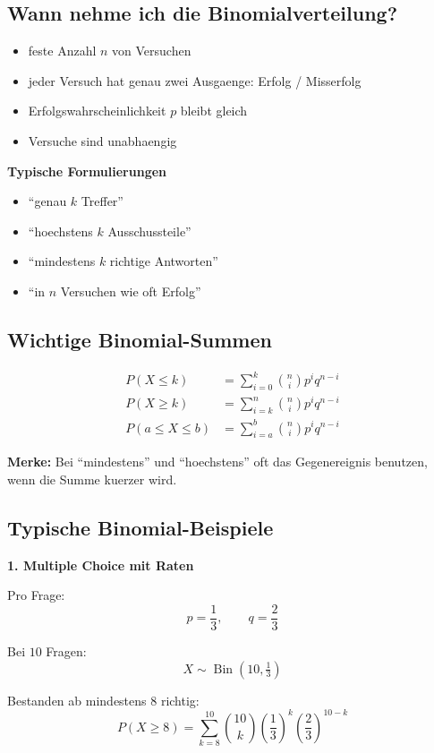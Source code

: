 \documentclass[a4paper,11pt]{article}
\begin{document}
\subsection{Wann nehme ich die Binomialverteilung?}
\begin{itemize}
  \item feste Anzahl $n$ von Versuchen
  \item jeder Versuch hat genau zwei Ausgaenge: Erfolg / Misserfolg
  \item Erfolgswahrscheinlichkeit $p$ bleibt gleich
  \item Versuche sind unabhaengig
\end{itemize}

\textbf{Typische Formulierungen}
\begin{itemize}
  \item ``genau $k$ Treffer''
  \item ``hoechstens $k$ Ausschussteile''
  \item ``mindestens $k$ richtige Antworten''
  \item ``in $n$ Versuchen wie oft Erfolg''
\end{itemize}

\subsection{Wichtige Binomial-Summen}
\begin{align*}
P(X\le k) &= \sum_{i=0}^k \binom{n}{i}p^i q^{n-i} \\
P(X\ge k) &= \sum_{i=k}^n \binom{n}{i}p^i q^{n-i} \\
P(a\le X\le b) &= \sum_{i=a}^b \binom{n}{i}p^i q^{n-i}
\end{align*}

\textbf{Merke:}
Bei ``mindestens'' und ``hoechstens'' oft das Gegenereignis benutzen, wenn die Summe kuerzer wird.

\subsection{Typische Binomial-Beispiele}
\textbf{1. Multiple Choice mit Raten}

Pro Frage:
\[
p=\frac13,\qquad q=\frac23
\]

Bei $10$ Fragen:
\[
X \sim \operatorname{Bin}(10,\tfrac13)
\]

Bestanden ab mindestens $8$ richtig:
\[
P(X\ge 8)=\sum_{k=8}^{10}\binom{10}{k}\left(\frac13\right)^k\left(\frac23\right)^{10-k}
\]
\end{document}
